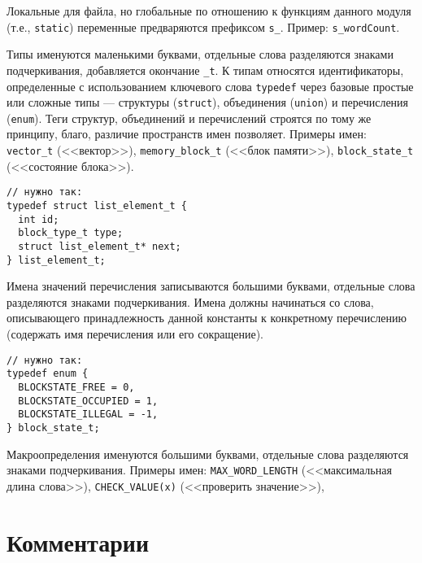\zzstyleitem

Локальные для файла, но глобальные по отношению к функциям данного
модуля (т.е., \texttt{static}) переменные предваряются префиксом
\texttt{s\_}. Пример: \texttt{s\_wordCount}.

\zzstyleitem

Типы именуются маленькими буквами, отдельные слова разделяются знаками
подчеркивания, добавляется окончание \texttt{\_t}. К типам относятся
идентификаторы, определенные с использованием ключевого слова
\texttt{typedef} через базовые простые или сложные типы --- структуры
(\texttt{struct}), объединения (\texttt{union}) и перечисления
(\texttt{enum}). Теги структур, объединений и перечислений строятся по
тому же принципу, благо, различие пространств имен позволяет. Примеры
имен: \texttt{vector\_t} (<<вектор>>), \texttt{memory\_block\_t} (<<блок
памяти>>), \texttt{block\_state\_t} (<<состояние блока>>).

\begin{verbatim}
// нужно так:
typedef struct list_element_t {
  int id;
  block_type_t type;
  struct list_element_t* next;
} list_element_t;
\end{verbatim}

\zzstyleitem

Имена значений перечисления записываются большими буквами, отдельные
слова разделяются знаками подчеркивания. Имена должны начинаться со
слова, описывающего принадлежность данной константы к конкретному
перечислению (содержать имя перечисления или его сокращение).

\begin{verbatim}
// нужно так:
typedef enum {
  BLOCKSTATE_FREE = 0,
  BLOCKSTATE_OCCUPIED = 1,
  BLOCKSTATE_ILLEGAL = -1,
} block_state_t;
\end{verbatim}

\zzstyleitem

Макроопределения именуются большими буквами, отдельные слова разделяются
знаками подчеркивания. Примеры имен: \texttt{MAX\_WORD\_LENGTH}
(<<максимальная длина слова>>), \texttt{CHECK\_VALUE(x)} (<<проверить
значение>>),


\section{Комментарии}


\zzstyleitem


